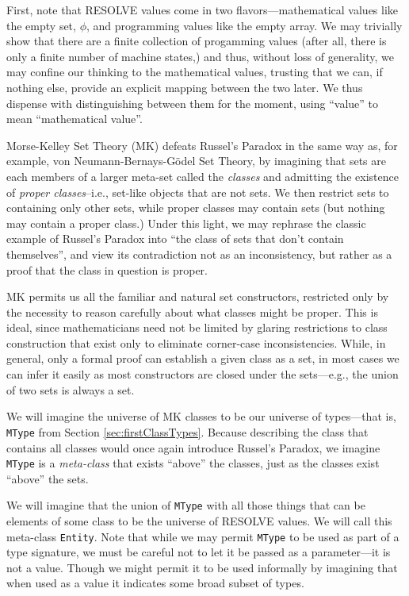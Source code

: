First, note that RESOLVE values come in two flavors---mathematical values like the empty set, $\phi$, and programming values like the empty array.  We may trivially show that there are a finite collection of progamming values (after all, there is only a finite number of machine states,) and thus, without loss of generality, we may confine our thinking to the mathematical values, trusting that we can, if nothing else, provide an explicit mapping between the two later.  We thus dispense with distinguishing between them for the moment, using ``value'' to mean ``mathematical value''.

Morse-Kelley Set Theory (MK) defeats Russel's Paradox in the same way as, for example, von Neumann-Bernays-G\"{o}del Set Theory, by imagining that sets are each members of a larger meta-set called the \emph{classes} and admitting the existence of \emph{proper classes}--i.e., set-like objects that are not sets.  We then restrict sets to containing only other sets, while proper classes may contain sets (but nothing may contain a proper class.)  Under this light, we may rephrase the classic example of Russel's Paradox into ``the class of sets that don't contain themselves'', and view its contradiction not as an inconsistency, but rather as a proof that the class in question is proper.

MK permits us all the familiar and natural set constructors, restricted only by the necessity to reason carefully about what classes might be proper.  This is ideal, since mathematicians need not be limited by glaring restrictions to class construction that exist only to eliminate corner-case inconsistencies.  While, in general, only a formal proof can establish a given class as a set, in most cases we can infer it easily as most constructors are closed under the sets---e.g., the union of two sets is always a set.

We will imagine the universe of MK classes to be our universe of types---that is, \texttt{MType} from Section \ref{sec:firstClassTypes}.  Because describing the class that contains all classes would once again introduce Russel's Paradox, we imagine \texttt{MType} is a \emph{meta-class} that exists ``above'' the classes, just as the classes exist ``above'' the sets.

We will imagine that the union of \texttt{MType} with all those things that can be elements of some class to be the universe of RESOLVE values.  We will call this meta-class \texttt{Entity}.  Note that while we may permit \texttt{MType} to be used as part of a type signature, we must be careful not to let it be passed as a parameter---it is not a value.  Though we might permit it to be used informally by imagining that when used as a value it indicates some broad subset of types.

